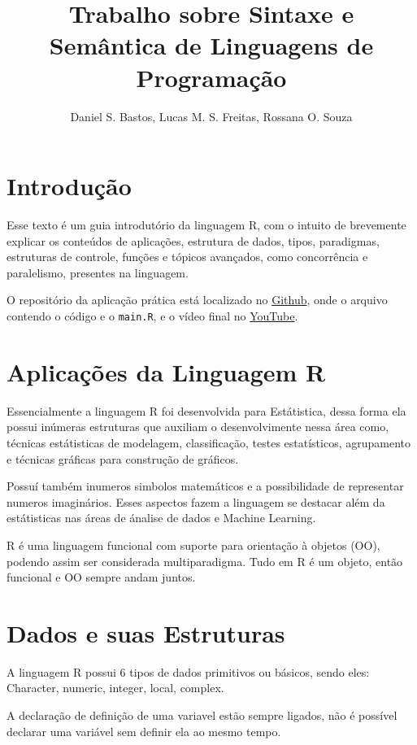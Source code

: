 \documentclass[12pt]{article}
\title{Trabalho sobre Sintaxe e Semântica de Linguagens de Programação
}
\author{Daniel S. Bastos\inst{1}, Lucas M. S. Freitas\inst{2}, Rossana O. Souza \inst{3} }
\begin{document}
 

\maketitle

\section{Introdução}

Esse texto é um guia introdutório da linguagem R, com o intuito de brevemente explicar os conteúdos de aplicações, estrutura de dados, tipos, paradigmas, estruturas de controle, funções e tópicos avançados, como concorrência e paralelismo, presentes na linguagem.

O repositório da aplicação prática está localizado no \href{https://github.com/danielSbastos/puc-lpg-trabalho-1}{Github}, onde o arquivo contendo o código e o \texttt{main.R}, e o vídeo final no \href{https://github.com/danielSbastos/puc-lpg-trabalho-1}{YouTube}.

\section{Aplicações da Linguagem R} \label{sec:Aplicações da Linguagem R}
Essencialmente a linguagem R foi desenvolvida para Estátistica, dessa forma ela possui inúmeras estruturas que auxiliam o desenvolvimente nessa área como, técnicas estátisticas de modelagem, classificação, testes estatísticos, agrupamento e técnicas gráficas para construção de gráficos.

Possuí também inumeros simbolos matemáticos e a possibilidade de representar numeros imaginários. Esses aspectos fazem a linguagem se destacar além da estátisticas nas áreas de ánalise de dados e Machine Learning.

R é uma linguagem funcional com suporte para orientação à objetos (OO), podendo assim ser considerada multiparadigma. Tudo em R é um objeto, então funcional e OO sempre andam juntos.

\section{Dados e suas Estruturas} \label{sec:Dados e suas Estruturas}
A linguagem R possui 6 tipos de dados primitivos ou básicos, sendo eles: Character, numeric, integer, local, complex.

    A declaração de definição de uma variavel estão sempre ligados, não é possível declarar uma variável sem definir ela ao mesmo tempo.
\end{document}
